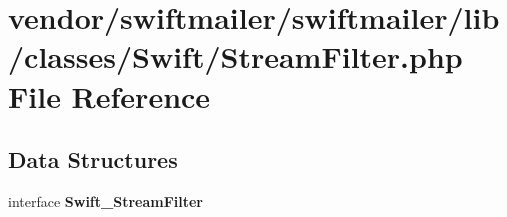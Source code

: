 \section{vendor/swiftmailer/swiftmailer/lib/classes/\+Swift/\+Stream\+Filter.php File Reference}
\label{_stream_filter_8php}
\subsection*{Data Structures}
\begin{DoxyCompactItemize}
\item 
interface {\bf Swift\+\_\+\+Stream\+Filter}
\end{DoxyCompactItemize}

